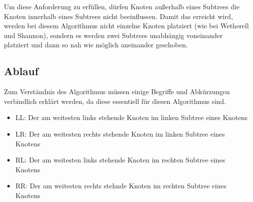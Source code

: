 Um diese Anforderung zu erfüllen, dürfen Knoten außerhalb eines Subtrees die Knoten innerhalb eines Subtrees nicht beeinflussen. 
Damit das erreicht wird, werden bei diesem Algorithmus nicht einzelne Knoten platziert (wie bei Wetherell und Shannon), 
sondern es werden zwei Subtrees unabhängig voneinander platziert und dann so nah wie möglich aneinander geschoben. 

\label{chap:kapitel3_3_Ablauf}
\subsection{Ablauf}

Zum Verständnis des Algorithmus müssen einige Begriffe und Abkürzungen verbindlich erklärt werden, 
da diese essentiell für diesen Algorithmus sind.
\begin{itemize}
    \item LL: Der am weitesten links stehende Knoten im linken Subtree eines Knotens
    \item LR: Der am weitesten rechts stehende Knoten im linken Subtree eines Knotens
    \item RL: Der am weitesten links stehende Knoten im rechten Subtree eines Knotens
    \item RR: Der am weitesten rechts stehnde Knoten im rechten Subtree eines Knotens
\end{itemize} 

